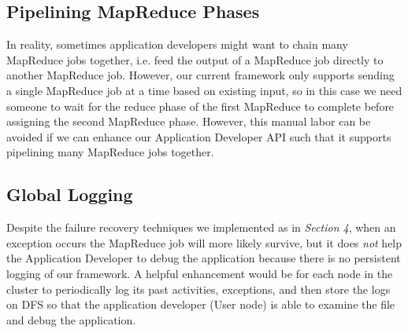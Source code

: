 \documentclass{article} %
\begin{document}
\subsection{Pipelining MapReduce Phases}
    \par\qquad In reality, sometimes application developers might want to chain many MapReduce jobs together, i.e. feed the output of a MapReduce job directly to another MapReduce job. However, our current framework only supports sending a single MapReduce job at a time based on existing input, so in this case we need someone to wait for the reduce phase of the first MapReduce to complete before assigning the second MapReduce phase. However, this manual labor can be avoided if we can enhance our Application Developer API such that it supports pipelining many MapReduce jobs together.

\subsection{Global Logging}
    \par\qquad Despite the failure recovery techniques we implemented as in \emph{Section 4}, when an exception occurs the MapReduce job will more likely survive, but it does \emph{not} help the Application Developer to debug the application because there is no persistent logging of our framework. A helpful enhancement would be for each node in the cluster to periodically log its past activities, exceptions, and then store the logs on DFS so that the application developer (User node) is able to examine the file and debug the application.
\end{document}

